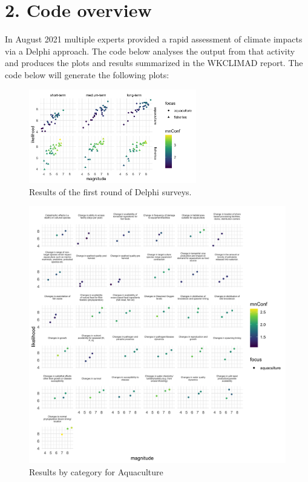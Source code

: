 \documentclass[
]{article}
\begin{document}
\hypertarget{code-overview}{%
\section{2. Code overview}\label{code-overview}}

In August 2021 multiple experts provided a rapid assessment of climate
impacts via a Delphi approach. The code below analyses the output from
that activity and produces the plots and results summarized in the
WKCLIMAD report. The code below will generate the following plots:

\begin{figure}
\centering
\includegraphics[width=0.65\textwidth,height=\textheight]{Figs/Fig1.png}
\caption{Results of the first round of Delphi surveys.}
\end{figure}

\begin{figure}
\centering
\includegraphics[width=1\textwidth,height=\textheight]{Figs/Fig2.png}
\caption{Results by category for Aquaculture}
\end{figure}
\end{document}
